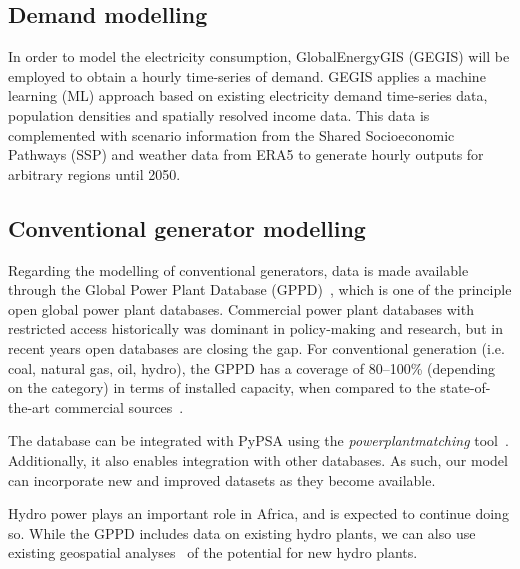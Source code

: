\documentclass[conference, a4paper]{IEEEtran}
\begin{document}
\subsection{Demand modelling} %
In order to model the electricity consumption, GlobalEnergyGIS (GEGIS) will be employed to obtain a hourly time-series of demand.
GEGIS applies a machine learning (ML) approach based on existing electricity demand time-series data, population densities and spatially resolved income data.
This data is complemented with scenario information from the Shared Socioeconomic Pathways (SSP) and weather data from ERA5 to generate hourly outputs for arbitrary regions until 2050.



\subsection{Conventional generator modelling} %
Regarding the modelling of conventional generators, data is made available through the Global Power Plant Database (GPPD)~\cite{globalenergyobservatory-google-ea-2018}, which is one of the principle open global power plant databases.
Commercial power plant databases with restricted access historically was dominant in policy-making and research, but in recent years open databases are closing the gap.
For conventional generation (i.e. coal, natural gas, oil, hydro), the GPPD has a coverage of 80--100\% (depending on the category) in terms of installed capacity, when compared to the state-of-the-art commercial sources~\cite{byers-friedrich-ea-2019}.

The database can be integrated with PyPSA using the \emph{powerplantmatching} tool~\cite{gotzens-heinrichs-ea-2019}.
Additionally, it also enables integration with other databases.
As such, our model can incorporate new and improved datasets as they become available.

Hydro power plays an important role in Africa, and is expected to continue doing so.
While the GPPD includes data on existing hydro plants, we can also use existing geospatial analyses~\cite{korkovelos-mentis-ea-2018} of the potential for new hydro plants.
\end{document}
